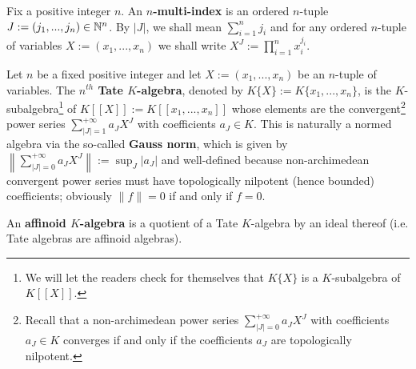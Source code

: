             \begin{convention} \label{conv: mutli_indices}
                Fix a positive integer $n$. An \textbf{$n$-multi-index} is an ordered $n$-tuple $J := (j_1, ..., j_n) \in \mathbb{N}^n$. By $|J|$, we shall mean $\sum_{i = 1}^n j_i$ and for any ordered $n$-tuple of variables $X := (x_1, ..., x_n)$ we shall write $X^J := \prod_{i = 1}^n x_i^{j_i}$.
            \end{convention}
            \begin{definition} \label{def: affinoid_algebras}
                Let $n$ be a fixed positive integer and let $X := (x_1, ..., x_n)$ be an $n$-tuple of variables. The \textbf{$n^{th}$ Tate $K$-algebra}, denoted by $K\{X\} := K\{x_1, ..., x_n\}$, is the $K$-subalgebra\footnote{We will let the readers check for themselves that $K\{X\}$ is a $K$-subalgebra of $K[\![X]\!]$.} of $K[\![X]\!] := K[\![x_1, ..., x_n]\!]$ whose elements are the convergent\footnote{Recall that a non-archimedean power series $\sum_{|J| = 0}^{+\infty} a_J X^J$ with coefficients $a_J \in K$ converges if and only if the coefficients $a_J$ are topologically nilpotent.} power series $\sum_{|J| = 1}^{+\infty} a_J X^J$ with coefficients $a_J \in K$. This is naturally a normed algebra via the so-called \textbf{Gauss norm}, which is given by $\left\|\sum_{|J| = 0}^{+\infty} a_J X^J\right\| := \sup_J |a_J|$ and well-defined because non-archimedean convergent power series must have topologically nilpotent (hence bounded) coefficients; obviously $\|f\| = 0$ if and only if $f = 0$.
                
                An \textbf{affinoid $K$-algebra} is a quotient of a Tate $K$-algebra by an ideal thereof (i.e. Tate algebras are  affinoid algebras). 
            \end{definition}
            
